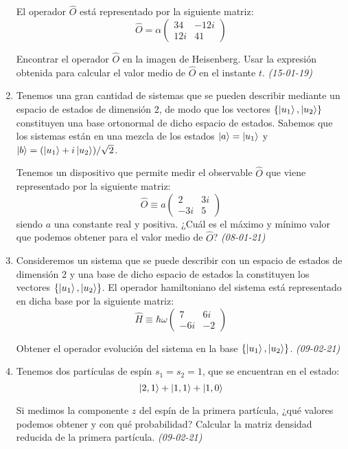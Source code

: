 \begin{enumerate}
    El operador $\hat{O}$ está representado por la siguiente matriz:
    \[
    \hat{O} = \alpha \begin{pmatrix} 34 & -12i \\ 12i & 41 \end{pmatrix}
    \]
    
    Encontrar el operador $\hat{O}$ en la imagen de Heisenberg. Usar la expresión obtenida para calcular el valor medio de $\hat{O}$ en el instante \( t \). \textit{(15-01-19)}
    
    \item Tenemos una gran cantidad de sistemas que se pueden describir mediante un espacio de estados de dimensión 2, de modo que los vectores $\{\ket{u_1}, \ket{u_2}\}$ constituyen una base ortonormal de dicho espacio de estados. Sabemos que los sistemas están en una mezcla de los estados $\ket{a} = \ket{u_1}$ y $\ket{b} = (\ket{u_1} + i \ket{u_2}) / \sqrt{2}$. 

    Tenemos un dispositivo que permite medir el observable $\hat{O}$ que viene representado por la siguiente matriz:
    \[
    \hat{O} \equiv a \begin{pmatrix} 2 & 3i \\ -3i & 5 \end{pmatrix}
    \]
    siendo $a$ una constante real y positiva. ¿Cuál es el máximo y mínimo valor que podemos obtener para el valor medio de $\hat{O}$? \textit{(08-01-21)}

    \item Consideremos un sistema que se puede describir con un espacio de estados de dimensión 2 y una base de dicho espacio de estados la constituyen los vectores $\{\ket{u_1}, \ket{u_2}\}$. El operador hamiltoniano del sistema está representado en dicha base por la siguiente matriz:
    \[
    \hat{H} \equiv \hbar \omega \begin{pmatrix} 7 & 6i \\ -6i & -2 \end{pmatrix}
    \]
    
    Obtener el operador evolución del sistema en la base $\{\ket{u_1}, \ket{u_2}\}$. \textit{(09-02-21)}
    
    \item Tenemos dos partículas de espín $s_1 = s_2 = 1$, que se encuentran en el estado:
    \[
    \ket{2,1} + \ket{1,1} + \ket{1,0}
    \]
    
    Si medimos la componente $z$ del espín de la primera partícula, ¿qué valores podemos obtener y con qué probabilidad? Calcular la matriz densidad reducida de la primera partícula. \textit{(09-02-21)}


\end{enumerate}
